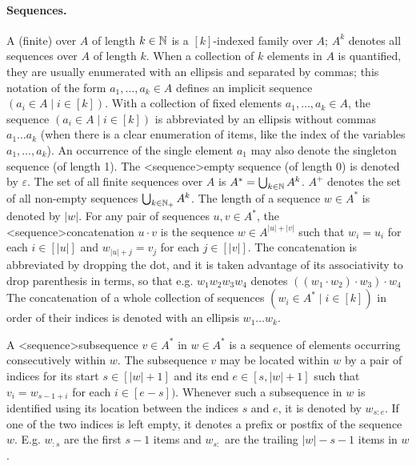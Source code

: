 \documentclass[../document.tex]{subfiles}
\begin{document}
    \paragraph{Sequences.}
    A (finite)  over \(A\) of length \(k \in \mathbb{N}\) is a \([k]\)-indexed family over \(A\); \(A^k\) denotes all sequences over \(A\) of length \(k\).
    When a collection of \(k\) elements in \(A\) is quantified, they are usually enumerated with an ellipsis and separated by commas; this notation of the form \(a_1, \ldots, a_k \in A\) defines an implicit sequence \((a_i \in A \mid i \in [k])\).
    With a collection of fixed elements \(a_1, \ldots, a_k \in A\), the sequence \((a_i \in A \mid i \in [k])\) is abbreviated by an ellipsis without commas \(a_1 \ldots a_k\) (when there is a clear enumeration of items, like the index of the variables \(a_1, \ldots, a_k\)).
    An occurrence of the single element \(a_1\) may also denote the singleton sequence (of length 1).
    The <sequence>{empty sequence} (of length 0) is denoted by \(\varepsilon\).
    The set of all finite sequences over \(A\) is \(A^* = \bigcup_{k \in \mathbb{N}} A^k\).
    \(A^+\) denotes the set of all non-empty sequences \(\bigcup_{k \in \mathbb{N}_+} A^k\).
    The length of a sequence \(w \in A^*\) is denoted by \(|w|\).
    For any pair of sequences \(u,v \in A^*\), the <sequence>{concatenation} \(u \cdot v\) is the sequence \(w\in A^{|u|+|v|}\) such that \(w_i=u_i\) for each \(i \in [|u|]\) and \(w_{|u|+j} = v_j\) for each \(j \in [|v|]\).
    The concatenation is abbreviated by dropping the dot, and it is taken advantage of its associativity to drop parenthesis in terms, so that e.g. \(w_1 w_2 w_3 w_4\) denotes \(((w_1 \cdot w_2) \cdot w_3) \cdot w_4\)
    The concatenation of a whole collection of sequences \((w_i \in A^* \mid i \in [k])\) in order of their indices is denoted with an ellipsis \(w_1 \ldots w_k\).

    A <sequence>{subsequence} \(v \in A^*\) in \(w\in A^*\) is a sequence of elements occurring consecutively within \(w\).
    The subsequence \(v\) may be located within \(w\) by a pair of indices for its start \(s \in [|w|+1]\) and its end \(e \in [s, |w|+1]\) such that \(v_i = w_{s-1+i}\) for each \(i \in [e-s])\).
    Whenever such a subsequence in \(w\) is identified using its location between the indices \(s\) and \(e\), it is denoted by \(w_{s:e}\).
    If one of the two indices is left empty, it denotes a prefix or postfix of the sequence \(w\).
    E.g. \(w_{:s}\) are the first \(s-1\) items and \(w_{s:}\) are the trailing \(|w|-s-1\) items in \(w\).
\end{document}
